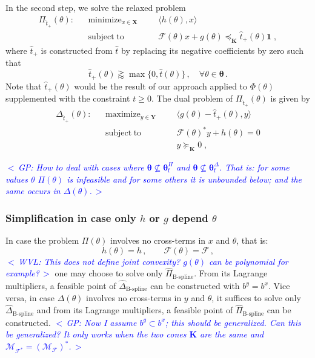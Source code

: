 \documentclass{article}
\DeclareMathOperator*{\minimize}{minimize}
\DeclareMathOperator*{\maximize}{maximize}
\DeclareMathOperator*{\subj}{subject\;to}
\newcommand{\commentGP}[1]{\noindent \textcolor{blue}{\emph{$<\,$GP: #1$\,>$}}}%
\newcommand{\commentWVL}[1]{\noindent \textcolor{blue}{\emph{$<\,$WVL: #1$\,>$}}}%
\newcommand{\adj}{\ast}                     %
\newcommand{\feas}{\mathrm{f}}              %
\newcommand{\ppar}{\theta}                          %
\newcommand{\Ppar}{{\bm{\theta}}}                   %
\newcommand{\X}{\mathbf{X}}                         %
\newcommand{\Y}{\mathbf{Y}}                         %
\newcommand{\K}{\mathbf{K}}                         %
\newcommand{\calF}{\mathcal{F}}                     %
\newcommand{\Pfeas}{\Ppar^\Pi_\feas}                %
\newcommand{\Dfeas}{\Ppar^\Delta_\feas}             %
\newcommand{\calMF}{\mathcal{M}_{\mathcal{F}}}
\newcommand{\calMFadj}{\mathcal{M}_{\mathcal{F}^\adj}}
\begin{document}
In the second step, we solve the relaxed problem
\[ \begin{aligned}
\Pi_{\hat{t}_+}(\ppar): && \minimize_{x\in\X} &&& \langle h(\ppar), x \rangle\\%
                        && \subj              &&& \calF(\ppar)x +g(\ppar)\preceq_\K \hat{t}_+(\ppar) \mathbf{1} \;,%
\end{aligned} \]
where $\hat{t}_+$ is constructed from $\hat{t}$ by replacing its negative coefficients by zero such that
\[ \hat{t}_+(\ppar) \gtrapprox \max\{0, \hat{t}(\ppar)\}\,,\quad\forall\ppar\in\Ppar\,.%
\]
Note that $\hat{t}_+(\ppar)$ would be the result of our approach applied to $\Phi(\ppar)$ supplemented with the constraint $t\geq0$. The dual problem of $\Pi_{\hat{t}_+}(\ppar)$ is given by
\[ \begin{aligned}
\Delta_{\hat{t}_+}(\ppar): && \maximize_{y\in\Y} &&& \langle g(\ppar) - \hat{t}_+(\ppar), y \rangle\\%
               && \subj              &&& \calF(\ppar)^* y + h(\ppar)= 0\\
               &&                    &&& y \succeq_\K 0  \;,
\end{aligned}\]



\commentGP{How to deal with cases where $\Ppar\nsubseteq\Pfeas$ and $\Ppar\nsubseteq\Dfeas$. That is: for some values $\ppar$ $\Pi(\ppar)$ is infeasible and for some others it is unbounded below; and the same occurs in $\Delta(\ppar)$.}


\subsubsection{Simplification in case only $h$ or $g$ depend $\ppar$}%

In case the problem $\Pi(\ppar)$ involves no cross-terms in $x$ and $\ppar$, that is:
\[ h(\ppar) = h\,,\qquad \calF(\ppar) = \calF\,,
\]
\commentWVL{This does not define joint convexity? $g(\ppar)$ can be polynomial
for example?}
one may choose to solve only $\hat{\Pi}_\text{B-spline}$. From its Lagrange multipliers, a feasible point of $\hat{\Delta}_\text{B-spline}$ can be constructed with $b^y=b^x$. Vice versa, in case $\Delta(\ppar)$ involves no cross-terms in $y$ and $\ppar$, it suffices to solve only $\hat{\Delta}_\text{B-spline}$ and from its Lagrange multipliers, a feasible point of $\hat{\Pi}_\text{B-spline}$ can be constructed. \commentGP{Now I assume $b^g\subset b^x$; this should be generalized. Can this be generalized? It only works when the two cones $\K$ are the same and $\calMFadj=(\calMF)^\adj$.}
\end{document}
